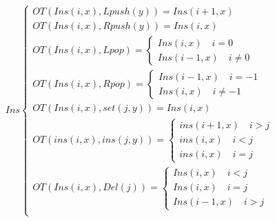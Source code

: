 \documentclass[a4paper,UTF8]{article}
\begin{document}
\begin{equation}
\begin{aligned}
Ins \begin{cases}
OT(Ins(i,x),Lpush(y))=
{Ins(i+1,x)} \\
OT(Ins(i,x),Rpush(y))=
{Ins(i,x)}\\
OT(Ins(i,x),Lpop)=\begin{cases}
{Ins(i,x)}  \quad i=0\\
{Ins(i-1,x)}  \quad i \neq 0 \end{cases}\\
OT(Ins(i,x),Rpop)=\begin{cases}
{Ins(i-1,x)} \quad i=-1\\
{Ins(i,x)}  \quad i \neq -1 \end{cases} \\
OT(Ins(i,x), set (j,y)) =
{Ins(i,x)}\\
OT(ins (i,x), ins (j,y)) =\begin{cases}
	{ins(i+1, x)}   \quad i > j\\
	{ins(i, x)}    \quad i < j\\
	{ins(i, x)}   \quad  i = j \end{cases} \\
OT(Ins(i,x),Del(j))=\begin{cases}
{Ins(i,x)}  \quad i<j\\
{Ins(i,x)} \quad i=j\\
{Ins(i-1,x)} \quad i>j \end{cases}\\
\end{cases}
\end{aligned}
\end{equation}
\end{document}
